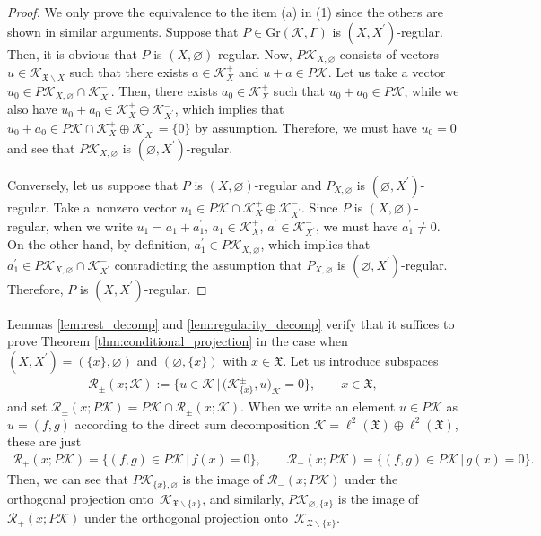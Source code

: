 \documentclass[11pt]{article}
\numberwithin{equation}{section}
\numberwithin{equation}{section}
\newcommand{\pr}[1]{#1^{\prime}}
\newcommand{\mfrak}[1]{\mathfrak{#1}}
\newcommand{\mcal}[1]{\mathcal{#1}}
\newcommand{\mrm}[1]{\mathrm{#1}}
\begin{document}
\begin{proof}
We only prove the equivalence to the item (a) in (1) since the others are shown in similar arguments.
Suppose that $P\in \mrm{Gr}(\mcal{K},\Gamma)$ is $(X,\pr{X})$-regular. Then, it is obvious that $P$ is $(X,\varnothing)$-regular. Now, $P\mcal{K}_{X,\varnothing}$ consists of vectors $u\in\mcal{K}_{\mfrak{X}\backslash X}$ such that there exists $a\in \mcal{K}_{X}^{+}$ and $u+a\in P\mcal{K}$. Let us take a vector $u_{0}\in P\mcal{K}_{X,\varnothing}\cap \mcal{K}_{\pr{X}}^{-}$. Then, there exists $a_{0}\in \mcal{K}_{X}^{+}$ such that $u_{0}+a_{0}\in P\mcal{K}$, while we also have $u_{0}+a_{0}\in \mcal{K}_{X}^{+}\oplus \mcal{K}_{\pr{X}}^{-}$, which implies that $u_{0}+a_{0}\in P\mcal{K}\cap \mcal{K}_{X}^{+}\oplus \mcal{K}_{\pr{X}}^{-}=\{0\}$ by assumption. Therefore, we must have $u_{0}=0$ and see that $P\mcal{K}_{X,\varnothing}$ is $(\varnothing,\pr{X})$-regular.

Conversely, let us suppose that $P$ is $(X,\varnothing)$-regular and $P_{X,\varnothing}$ is $(\varnothing,\pr{X})$-regular. Take a~nonzero vector $u_{1}\in P\mcal{K}\cap \mcal{K}_{X}^{+}\oplus \mcal{K}_{\pr{X}}^{-}$. Since $P$ is $(X,\varnothing)$-regular, when we write $u_{1}=a_{1}+\pr{a}_{1}$, $a_{1}\in \mcal{K}_{X}^{+}$, $\pr{a}\in \mcal{K}_{\pr{X}}^{-}$, we must have $\pr{a}_{1}\neq 0$. On the other hand, by definition, $\pr{a}_{1}\in P\mcal{K}_{X,\varnothing}$, which implies that $\pr{a}_{1}\in P\mcal{K}_{X,\varnothing}\cap \mcal{K}_{\pr{X}}^{-}$ contradicting the assumption that $P_{X,\varnothing}$ is $(\varnothing,\pr{X})$-regular. Therefore, $P$ is $(X,\pr{X})$-regular.
\end{proof}

Lemmas \ref{lem:rest_decomp} and \ref{lem:regularity_decomp} verify that it suffices to prove Theorem \ref{thm:conditional_projection} in the case when $(X,\pr{X})=(\{x\},\varnothing)$ and $(\varnothing,\{x\})$ with $x\in\mfrak{X}$.
Let us introduce subspaces
\begin{gather*}
	\mcal{R}_{\pm}(x;\mcal{K}):=\big\{u\in \mcal{K}\,|\, \big(\mcal{K}^{\pm}_{\{x\}},u\big)_{\mcal{K}}=0\big\},\qquad x\in \mfrak{X},
\end{gather*}
and set $\mcal{R}_{\pm}(x;P\mcal{K})=P\mcal{K}\cap \mcal{R}_{\pm}(x;\mcal{K})$.
When we write an element $u\in P\mcal{K}$ as $u=(f,g)$ according to the direct sum decomposition $\mcal{K}=\ell^{2}(\mfrak{X})\oplus \ell^{2}(\mfrak{X})$, these are just
\begin{gather*}
	\mcal{R}_{+}(x;P\mcal{K}) =\{(f,g)\in P\mcal{K}\,|\,f(x)=0\}, \qquad \mcal{R}_{-}(x;P\mcal{K}) =\{(f,g)\in P\mcal{K}\,|\,g(x)=0\}.
\end{gather*}
Then, we can see that $P\mcal{K}_{\{x\},\varnothing}$ is the image of $\mcal{R}_{-}(x;P\mcal{K})$ under the orthogonal projection onto~$\mcal{K}_{\mfrak{X}\backslash\{x\}}$, and similarly, $P\mcal{K}_{\varnothing,\{x\}}$ is the image of $\mcal{R}_{+}(x;P\mcal{K})$ under the orthogonal projection onto~$\mcal{K}_{\mfrak{X}\backslash\{x\}}$.
\end{document}
